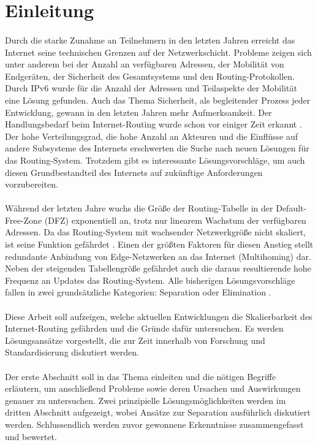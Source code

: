 \section{Einleitung}

\paragraph{}
Durch die starke Zunahme an Teilnehmern in den letzten Jahren erreicht das Internet seine technischen Grenzen auf der Netzwerkschicht. Probleme zeigen sich unter anderem bei der Anzahl an verfügbaren Adressen, der Mobilität von Endgeräten, der Sicherheit des Gesamtsystems und den Routing-Protokollen. Durch IPv6 wurde für die Anzahl der Adressen und Teilaspekte der Mobilität eine Lösung gefunden. Auch das Thema Sicherheit, als begleitender Prozess jeder Entwicklung, gewann in den letzten Jahren mehr Aufmerksamkeit. Der Handlungsbedarf beim Internet-Routing wurde schon vor einiger Zeit erkannt \cite{deering:1996:map}. Der hohe Verteilungsgrad, die hohe Anzahl an Akteuren und die Einflüsse auf andere Subsysteme des Internets erschwerten die Suche nach neuen Lösungen für das Routing-System. Trotzdem gibt es interessante Lösungsvorschläge, um auch diesen Grundbestandteil des Internets auf zukünftige Anforderungen vorzubereiten. 

\paragraph{} 
Während der letzten Jahre wuchs die Größe der Routing-Tabelle in der Default-Free-Zone (DFZ) exponentiell an, trotz nur linearem Wachstum der verfügbaren Adressen\cite{huston:2001:analyzing}. Da das Routing-System mit wachsender Netzwerkgröße nicht skaliert, ist seine Funktion gefährdet \cite{jen:2008:start}. Einen der größten Faktoren für diesen Anstieg stellt redundante Anbindung von Edge-Netzwerken an das Internet (Multihoming) dar. Neben der steigenden Tabellengröße gefährdet auch die daraus resultierende hohe Frequenz an Updates das Routing-System. Alle bisherigen Lösungsvorschläge fallen in zwei grundsätzliche Kategorien: Separation oder Elimination \cite{jen:2008:start}. 

\paragraph{}
Diese Arbeit soll aufzeigen, welche aktuellen Entwicklungen die Skalierbarkeit des Internet-Routing gefährden und die Gründe dafür untersuchen. Es werden Lösungsansätze vorgestellt, die zur Zeit innerhalb von Forschung und Standardisierung diskutiert werden.

\paragraph{}
Der erste Abschnitt soll in das Thema einleiten und die nötigen Begriffe erläutern, um anschließend Probleme sowie deren Ursachen und Auswirkungen genauer zu untersuchen. Zwei prinzipielle Lösungsmöglichkeiten werden im dritten Abschnitt aufgezeigt, wobei Ansätze zur Separation ausführlich diskutiert werden. Schlussendlich werden zuvor gewonnene Erkenntnisse zusammengefasst und bewertet.

 
